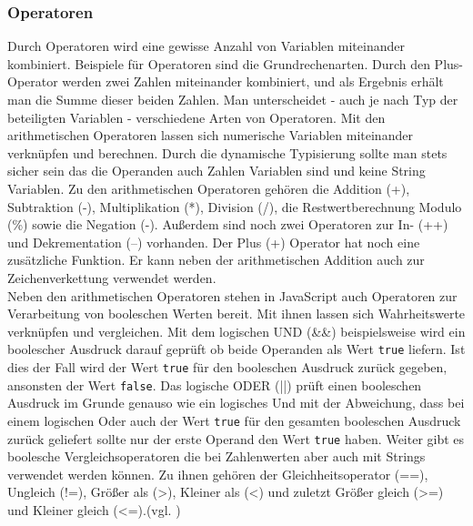 \subsubsection{Operatoren} \glqq Durch Operatoren wird eine gewisse Anzahl von Variablen miteinander kombiniert. Beispiele für Operatoren sind die Grundrechenarten. Durch den Plus-Operator werden zwei Zahlen miteinander kombiniert, und als Ergebnis erhält man die Summe dieser beiden Zahlen. Man unterscheidet - auch je nach Typ der beteiligten Variablen - verschiedene Arten von Operatoren.\grqq{}\cite[S.69]{WenzJava2008} Mit den arithmetischen Operatoren lassen sich numerische Variablen miteinander verknüpfen und berechnen. Durch die dynamische Typisierung sollte man stets sicher sein das die Operanden auch Zahlen Variablen sind und keine String Variablen. Zu den arithmetischen Operatoren gehören die Addition (+), Subtraktion (-), Multiplikation (*), Division (/), die Restwertberechnung Modulo (\%) sowie die Negation (-). Außerdem sind noch zwei Operatoren zur In- (++) und Dekrementation (--) vorhanden. Der Plus (+) Operator hat noch eine zusätzliche Funktion. Er kann neben der arithmetischen Addition auch zur Zeichenverkettung verwendet werden.\\Neben den arithmetischen Operatoren stehen in JavaScript auch Operatoren zur Verarbeitung von booleschen Werten bereit. Mit ihnen lassen sich Wahrheitswerte verknüpfen und vergleichen. Mit dem logischen UND (\&\&) beispielsweise wird ein boolescher Ausdruck darauf geprüft ob beide Operanden als Wert \texttt{true} liefern. Ist dies der Fall wird der Wert \texttt{true} für den booleschen Ausdruck zurück gegeben, ansonsten der Wert \texttt{false}. Das logische ODER (||) prüft einen booleschen Ausdruck im Grunde genauso wie ein logisches Und mit der Abweichung, dass bei einem logischen Oder auch der Wert \texttt{true} für den gesamten booleschen Ausdruck zurück geliefert sollte nur der erste Operand den Wert \texttt{true} haben. Weiter gibt es boolesche Vergleichsoperatoren die bei Zahlenwerten aber auch mit Strings verwendet werden können. Zu ihnen gehören der Gleichheitsoperator (==), Ungleich (!=), Größer als (\textgreater), Kleiner als (\textless) und zuletzt Größer gleich (\textgreater=) und Kleiner gleich (\textless=).(vgl. \cite[S.71ff]{WenzJava2008})

